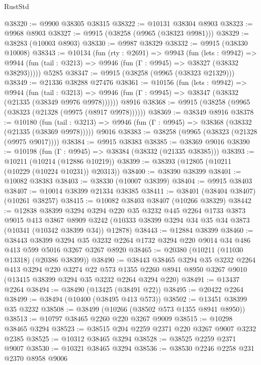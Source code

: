\begin{lexlean}{RustStd}
\begin{coremodule}
{\begin{coremodule}
{{{{{{{{{{{{{{{{{{{{{{{{{@38320 := @9900 @38305 @38315
@38322 := @10131 @38304 @8903
@38323 := @9968 @8903
@38327 := @9915 (@38258 (@9965 (@38323 @9981)))
@38329 := @38283 (@10003 @8903)
@38330 := @9987 @38329
@38332 := @9915 (@38330 @10008)
@38343 := @10134
    (fun (rty : @2691) =>
    @9943
      (fun (lets : @9942) =>
      @9944 (fun (tail : @3213) => @9946 (fun (Γ : @9945) => @38327 (@38332 @38293)))))
    @5285
@38347 := @9915 (@38258 (@9965 (@38323 @21329)))
@38349 := @21336 @38288 @27476
@38361 := @10156
    (fun (lets : @9942) =>
    @9944
      (fun (tail : @3213) =>
      @9946 (fun (Γ : @9945) => @38347 (@38332 (@21335 (@38349 @9976 @9978))))))
    @8916
@38368 := @9915 (@38258 (@9965 (@38323 (@21328 (@9975 (@8917 @9978))))))
@38369 := @38349 @8916
@38378 := @10180
    (fun (tail : @3213) => @9946 (fun (Γ : @9945) => @38368 (@38332 (@21335 (@38369 @9978)))))
    @9016
@38383 := @38258 (@9965 (@38323 (@21328 (@9975 @9017))))
@38384 := @9915 @38383
@38385 := @38369 @9016
@38390 := @10198 (fun (Γ : @9945) => @38384 (@38332 (@21335 @38385)))
@38393 := @10211 (@10214 (@12886 @10219))
@38399 := @38393 (@12805 (@10211 (@10229 (@10224 @10231)) @20313))
@38400 := @38390 @38399
@38401 := @10082 @38383
@38403 := @38330 (@10007 @38399)
@38404 := @9915 @38403
@38407 := @10014 @38399 @21334 @38385
@38411 := @38401 (@38404 @38407) (@10261 @38257)
@38415 := @10082 @38403 @38407 (@10266 @38329)
@38442 := @12838
    @38399
    @3294
    @3294
    @220
    @35
    @3232
    @445
    @2264
    @1733
    @3873
    @9015
    @413
    @3867
    @8909
    @3242
    (@10333 @38399 @3294 @34 @35 @34 @3873 (@10341 (@10342 @38399 @34)) @12878)
@38443 := @12884 @38399
@38460 := @38443
    @38399
    @3294
    @35
    @3232
    @2264
    @1732
    @3294
    @220
    @9014
    @34
    @486
    @413
    @599
    @5016
    @3267
    @3267
    @8920
@38465 := @20380 (@10211 (@11030 @13318) (@20386 @38399))
@38490 := @38443
    @38465
    @3294
    @35
    @3232
    @2264
    @413
    @3294
    @220
    @3274
    @22
    @573
    @1355
    @2260
    @8941
    @8950
    @3267
    @9010
    (@13415 @38399 @3294 @35 @3232 @2264 @3294 @220)
@38491 := @13437 @2264
@38494 := @38490 (@13425 (@38491 @22))
@38495 := @20422 @2264
@38499 := @38494 (@10400 (@38495 @413 @573))
@38502 := @13451 @38399 @35 @3232
@38508 := @38499 (@10266 (@38502 @573 @1355 @8941 @8950))
@38513 := @10797 @38465 @2260 @220 @3267 @9009
@38515 := @10298 @38465 @3294
@38523 := @38515 @204 @2259 @2371 @220 @3267 @9007 @3232 @2385
@38525 := @10312 @38465 @3294
@38528 := @38525 @2259 @2371 @9007
@38530 := @10321 @38465 @3294
@38536 := @38530 @2246 @2258 @231 @2370 @8958 @9006
}}}}}}}}}}}}}}}}}}}}}}}}}
\end{coremodule}}
\end{coremodule}
\end{lexlean}
